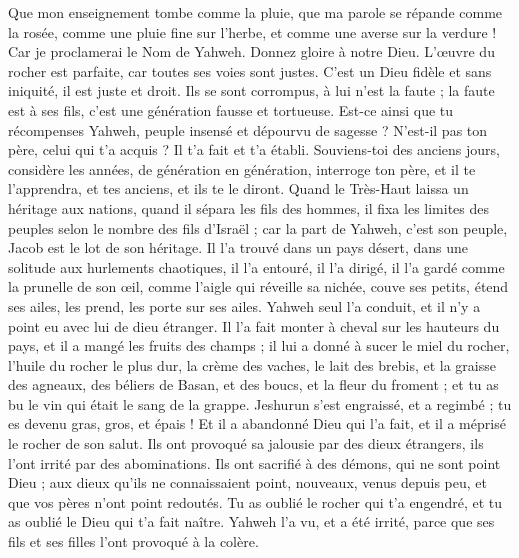 \begin{multicols}{2}
Que mon enseignement tombe comme la pluie, que ma parole se répande comme la rosée, comme une pluie fine sur l'herbe, et comme une averse sur la verdure !
Car je proclamerai le Nom de Yahweh. Donnez gloire à notre Dieu.
L'œuvre du rocher est parfaite, car toutes ses voies sont justes. C'est un Dieu fidèle et sans iniquité, il est juste et droit.
Ils se sont corrompus, à lui n'est la faute ; la faute est à ses fils, c'est une génération fausse et tortueuse.
Est-ce ainsi que tu récompenses Yahweh, peuple insensé et dépourvu de sagesse ? N'est-il pas ton père, celui qui t'a acquis ? Il t'a fait et t'a établi.
Souviens-toi des anciens jours, considère les années, de génération en génération, interroge ton père, et il te l'apprendra, et tes anciens, et ils te le diront.
Quand le Très-Haut laissa un héritage aux nations, quand il sépara les fils des hommes, il fixa les limites des peuples selon le nombre des fils d'Israël ;
car la part de Yahweh, c'est son peuple, Jacob est le lot de son héritage.
Il l'a trouvé dans un pays désert, dans une solitude aux hurlements chaotiques, il l'a entouré, il l'a dirigé, il l'a gardé comme la prunelle de son œil,
comme l'aigle qui réveille sa nichée, couve ses petits, étend ses ailes, les prend, les porte sur ses ailes.
Yahweh seul l'a conduit, et il n'y a point eu avec lui de dieu étranger.
Il l'a fait monter à cheval sur les hauteurs du pays, et il a mangé les fruits des champs ; il lui a donné à sucer le miel du rocher, l'huile du rocher le plus dur,
la crème des vaches, le lait des brebis, et la graisse des agneaux, des béliers de Basan, et des boucs, et la fleur du froment ; et tu as bu le vin qui était le sang de la grappe.
Jeshurun s'est engraissé, et a regimbé ; tu es devenu gras, gros, et épais ! Et il a abandonné Dieu qui l'a fait, et il a méprisé le rocher de son salut.
Ils ont provoqué sa jalousie par des dieux étrangers, ils l'ont irrité par des abominations.
Ils ont sacrifié à des démons, qui ne sont point Dieu ; aux dieux qu'ils ne connaissaient point, nouveaux, venus depuis peu, et que vos pères n'ont point redoutés.
Tu as oublié le rocher qui t'a engendré, et tu as oublié le Dieu qui t'a fait naître.
Yahweh l'a vu, et a été irrité, parce que ses fils et ses filles l'ont provoqué à la colère.

\end{multicols}

